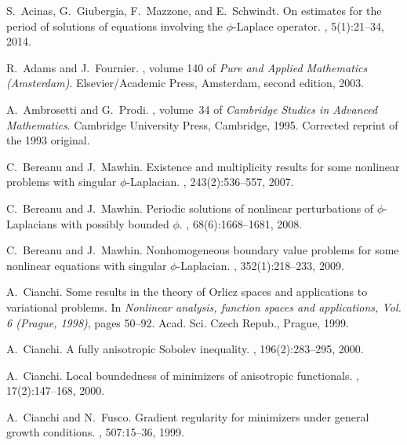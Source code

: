 \documentclass[twoside]{elsarticle}
\theoremstyle{remark}
\begin{document}
\def\cprime{$'$}
\begin{thebibliography}{10}

S.~Acinas, G.~Giubergia, F.~Mazzone, and E.~Schwindt.
\newblock On estimates for the period of solutions of equations involving the
  {$\phi$}-{L}aplace operator.
, 5(1):21--34, 2014.

R.~Adams and J.~Fournier.
, volume 140 of {\em Pure and Applied Mathematics
  (Amsterdam)}.
\newblock Elsevier/Academic Press, Amsterdam, second edition, 2003.

A.~Ambrosetti and G.~Prodi.
, volume~34 of {\em Cambridge
  Studies in Advanced Mathematics}.
\newblock Cambridge University Press, Cambridge, 1995.
\newblock Corrected reprint of the 1993 original.

C.~Bereanu and J.~Mawhin.
\newblock Existence and multiplicity results for some nonlinear problems with
  singular {$\phi$}-{L}aplacian.
, 243(2):536--557, 2007.

C.~Bereanu and J.~Mawhin.
\newblock Periodic solutions of nonlinear perturbations of
  {$\phi$}-{L}aplacians with possibly bounded {$\phi$}.
, 68(6):1668--1681, 2008.

C.~Bereanu and J.~Mawhin.
\newblock Nonhomogeneous boundary value problems for some nonlinear equations
  with singular {$\phi$}-{L}aplacian.
, 352(1):218--233, 2009.

A.~Cianchi.
\newblock Some results in the theory of {O}rlicz spaces and applications to
  variational problems.
\newblock In {\em Nonlinear analysis, function spaces and applications, {V}ol.
  6 ({P}rague, 1998)}, pages 50--92. Acad. Sci. Czech Repub., Prague, 1999.

A.~Cianchi.
\newblock A fully anisotropic {S}obolev inequality.
, 196(2):283--295, 2000.

A.~Cianchi.
\newblock Local boundedness of minimizers of anisotropic functionals.
, 17(2):147--168,
  2000.

A.~Cianchi and N.~Fusco.
\newblock Gradient regularity for minimizers under general growth conditions.
, 507:15--36, 1999.


\end{thebibliography}
\end{document}
